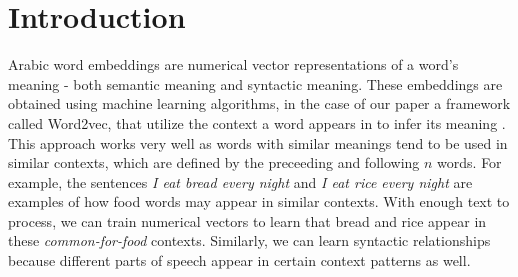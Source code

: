 \section{Introduction}
\label{sec:introduction}


Arabic word embeddings are numerical vector representations of a word's meaning - both semantic meaning and syntactic meaning. These embeddings are obtained using machine learning algorithms, in the case of our paper a framework called Word2vec, that utilize the context a word appears in to infer its meaning \cite{mikoloveffic:2013,mikolovdist:2013}. This approach works very well as words with similar meanings tend to be used in similar contexts, which are defined by the preceeding and following $n$ words. For example, the sentences \textit{I eat bread every night} and \textit{I eat rice every night} are examples of how food words may appear in similar contexts. With enough text to process, we can train numerical vectors to learn that bread and rice appear in these \textit{common-for-food} contexts. Similarly, we can learn syntactic relationships because different parts of speech appear in certain context patterns as well.
\\
\\
